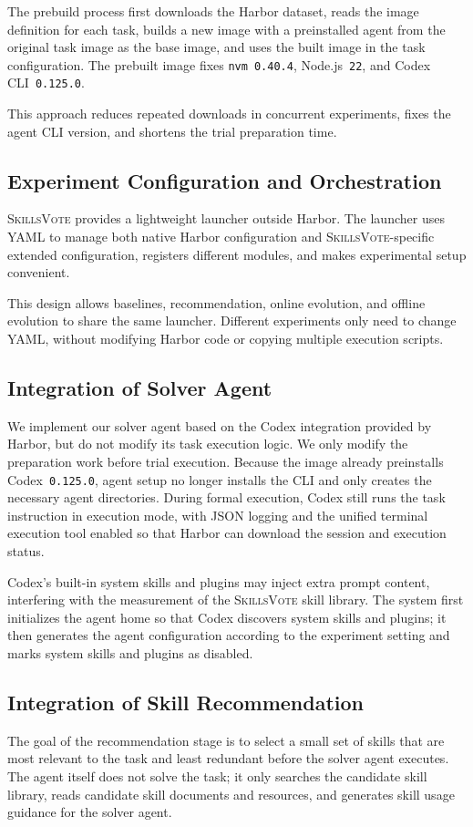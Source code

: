 \documentclass{llmxive}
\providecommand{\ours}{\textsc{SkillsVote}\xspace}
\begin{document}
The prebuild process first downloads the Harbor dataset, reads the image definition for each task, builds a new image with a preinstalled agent from the original task image as the base image, and uses the built image in the task configuration. The prebuilt image fixes \texttt{nvm}~\texttt{0.40.4}, Node.js~\texttt{22}, and Codex CLI~\texttt{0.125.0}.

This approach reduces repeated downloads in concurrent experiments, fixes the agent CLI version, and shortens the trial preparation time.

\subsection{Experiment Configuration and Orchestration}
\ours provides a lightweight launcher outside Harbor. The launcher uses YAML to manage both native Harbor configuration and \ours-specific extended configuration, registers different modules, and makes experimental setup convenient.

This design allows baselines, recommendation, online evolution, and offline evolution to share the same launcher. Different experiments only need to change YAML, without modifying Harbor code or copying multiple execution scripts.

\subsection{Integration of Solver Agent}
We implement our solver agent based on the Codex integration provided by Harbor, but do not modify its task execution logic. We only modify the preparation work before trial execution. Because the image already preinstalls Codex~\texttt{0.125.0}, agent setup no longer installs the CLI and only creates the necessary agent directories. During formal execution, Codex still runs the task instruction in execution mode, with JSON logging and the unified terminal execution tool enabled so that Harbor can download the session and execution status.

Codex's built-in system skills and plugins may inject extra prompt content, interfering with the measurement of the \ours skill library. The system first initializes the agent home so that Codex discovers system skills and plugins; it then generates the agent configuration according to the experiment setting and marks system skills and plugins as disabled.

\subsection{Integration of Skill Recommendation}
The goal of the recommendation stage is to select a small set of skills that are most relevant to the task and least redundant before the solver agent executes. The agent itself does not solve the task; it only searches the candidate skill library, reads candidate skill documents and resources, and generates skill usage guidance for the solver agent.
\end{document}
